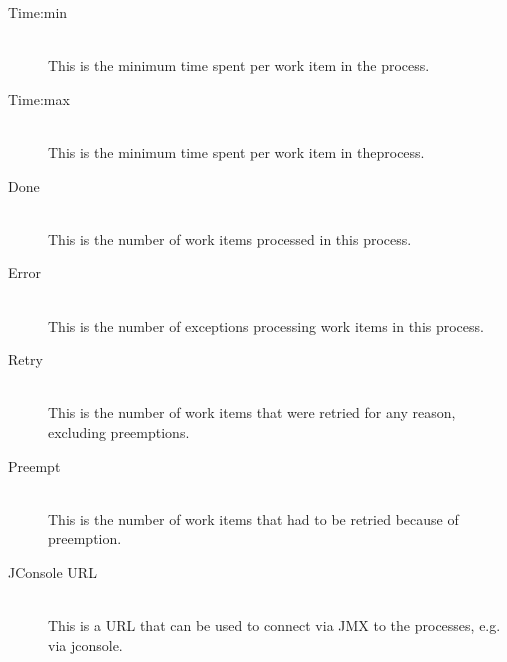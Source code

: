 \begin{description}
          \item[Time:min] \hfill \\
            This is the minimum time spent per work item in the process.
            
          \item[Time:max] \hfill \\
            This is the minimum time spent per work item in theprocess.
            
          \item[Done] \hfill \\
            This is the number of work items processed in this process.
            
          \item[Error] \hfill \\
            This is the number of exceptions processing work items in this process.
            
          \item[Retry] \hfill \\
            This is the number of work items that were retried for any reason, excluding
            preemptions.
            
          \item[Preempt] \hfill \\
            This is the number of work items that had to be retried because of preemption.
            
          \item[JConsole URL] \hfill \\
            This is a URL that can be used to connect via JMX to the processes, e.g. via
            jconsole.

      \end{description}
